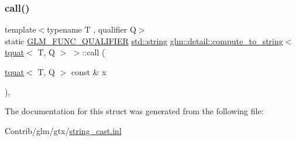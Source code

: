 \subsubsection{\texorpdfstring{call()}{call()}}
{\footnotesize\ttfamily template$<$typename T , qualifier Q$>$ \\
static \mbox{\hyperlink{setup_8hpp_a33fdea6f91c5f834105f7415e2a64407}{G\+L\+M\+\_\+\+F\+U\+N\+C\+\_\+\+Q\+U\+A\+L\+I\+F\+I\+ER}} \mbox{\hyperlink{_s_d_l__opengl__glext_8h_ae84541b4f3d8e1ea24ec0f466a8c568b}{std\+::string}} \mbox{\hyperlink{structglm_1_1detail_1_1compute__to__string}{glm\+::detail\+::compute\+\_\+to\+\_\+string}}$<$ \mbox{\hyperlink{structglm_1_1tquat}{tquat}}$<$ T, Q $>$ $>$\+::call (\begin{DoxyParamCaption}\item[{\mbox{\hyperlink{structglm_1_1tquat}{tquat}}$<$ T, Q $>$ const \&}]{x }\end{DoxyParamCaption})\hspace{0.3cm}{\ttfamily [inline]}, {\ttfamily [static]}}



The documentation for this struct was generated from the following file\+:\begin{DoxyCompactItemize}
\item 
Contrib/glm/gtx/\mbox{\hyperlink{string__cast_8inl}{string\+\_\+cast.\+inl}}\end{DoxyCompactItemize}
